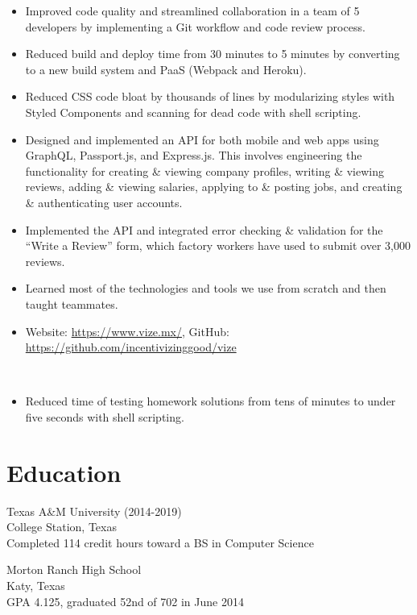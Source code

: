 \documentclass{resume}
\begin{document}
\begin{itemize}
    \item Improved code quality and streamlined collaboration in a team of 5
          developers by implementing a Git workflow and code review process.
    \item Reduced build and deploy time from 30 minutes to 5 minutes by
          converting to a new build system and PaaS (Webpack and Heroku).
    \item Reduced CSS code bloat by thousands of lines by modularizing
          styles with Styled Components and scanning for dead code with
          shell scripting.
    \item Designed and implemented an API for both mobile and web apps using
          GraphQL, Passport.js, and Express.js. This involves engineering the
          functionality for creating \& viewing company profiles, writing \&
          viewing reviews, adding \& viewing salaries, applying to \& posting
          jobs, and creating \& authenticating user accounts.
    \item Implemented the API and integrated error checking \& validation for
          the ``Write a Review'' form, which factory workers have used to submit
          over 3,000 reviews.
    \item Learned most of the technologies and tools we use from scratch and
          then taught teammates.
    \item Website: \href{https://www.vize.mx/}{https://www.vize.mx/},
          GitHub: \href{https://github.com/incentivizinggood/vize}{https://github.com/incentivizinggood/vize}
\end{itemize}

 \\

\begin{itemize}
    \item Reduced time of testing homework solutions from tens of minutes to
          under five seconds with shell scripting.
\end{itemize}

\section{Education}

Texas A\&M University (2014-2019) \\
College Station, Texas \\
Completed 114 credit hours toward a BS in Computer Science

\vspace{1em}
Morton Ranch High School \\
Katy, Texas \\
GPA 4.125, graduated 52nd of 702 in June 2014
\end{document}
